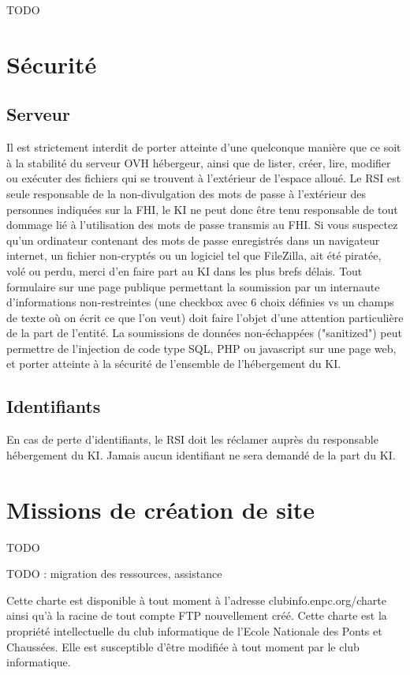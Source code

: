 \documentclass{charteki019}
\begin{document}
TODO

\section{Sécurité}

\subsection{Serveur}

Il est strictement interdit de porter atteinte d'une quelconque manière que ce soit à la stabilité du serveur OVH hébergeur, ainsi que de lister, créer, lire, modifier ou exécuter des fichiers qui se trouvent à l'extérieur de l'espace alloué.
Le RSI est seule responsable de la non-divulgation des mots de passe à l'extérieur des personnes indiquées sur la FHI, le KI ne peut donc être tenu responsable de tout dommage lié à l'utilisation des mots de passe transmis au FHI. Si vous suspectez qu'un ordinateur contenant des mots de passe enregistrés dans un navigateur internet, un fichier non-cryptés ou un logiciel tel que FileZilla, ait été piratée, volé ou perdu, merci d'en faire part au KI dans les plus brefs délais.
Tout formulaire sur une page publique permettant la soumission par un internaute d'informations non-restreintes (une checkbox avec 6 choix définies vs un champs de texte où on écrit ce que l'on veut) doit faire l'objet d'une attention particulière de la part de l'entité. La soumissions de données non-échappées ("sanitized") peut permettre de l'injection de code type SQL, PHP ou javascript sur une page web, et porter atteinte à la sécurité de l'ensemble de l'hébergement du KI.

\subsection{Identifiants}

En cas de perte d'identifiants, le RSI doit les réclamer auprès du responsable hébergement du KI. Jamais aucun identifiant ne sera demandé de la part du KI.

\section{Missions de création de site}

TODO

TODO : migration des ressources, assistance

Cette charte est disponible à tout moment à l'adresse clubinfo.enpc.org/charte ainsi qu'à la racine de tout compte FTP nouvellement créé. Cette charte est la propriété intellectuelle du club informatique de l'Ecole Nationale des Ponts et Chaussées. Elle est susceptible d'être modifiée à tout moment par le club informatique.
\end{document}
